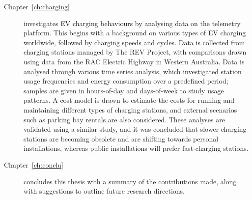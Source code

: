 \begin{description}
	\item [Chapter~\ref{ch:charging}] investigates EV charging behaviours by analysing data on the telemetry platform. This begins with a background on various types of EV charging worldwide, followed by charging speeds and cycles. Data is collected from charging stations managed by The REV Project, with comparisons drawn using data from the RAC Electric Highway in Western Australia. Data is analysed through various time series analysis, which investigated station usage frequencies and energy consumption over a predefined period; samples are given in hours-of-day and days-of-week to study usage patterns. A cost model is drawn to estimate the costs for running and maintaining different types of charging stations, and external scenarios such as parking bay rentals are also considered. These analyses are validated using a similar study, and it was concluded that slower charging stations are becoming obsolete and are shifting towards personal installations, whereas public installations will prefer fast-charging stations. 
	\item [Chapter~\ref{ch:conclu}] concludes this thesis with a summary of the contributions made, along with suggestions to outline future research directions.
\end{description}


